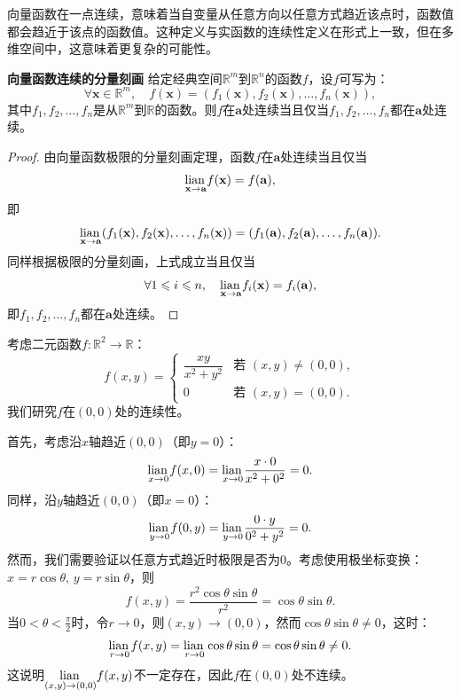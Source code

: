 \documentclass[12pt,UTF8]{ctexbook}
\begin{document}
向量函数在一点连续，意味着当自变量从任意方向以任意方式趋近该点时，函数值都会趋近于该点的函数值。这种定义与实函数的连续性定义在形式上一致，但在多维空间中，这意味着更复杂的可能性。


\begin{tm}{\textbf{向量函数连续的分量刻画}}
给定经典空间$\mathbb{R}^m$到$\mathbb{R}^n$的函数$f$，设$f$可写为：
$$ \forall \mathbf{x} \in \mathbb{R}^m, \quad f(\mathbf{x}) = (f_1(\mathbf{x}), f_2(\mathbf{x}), \ldots, f_n(\mathbf{x})), $$
其中$f_1, f_2, \ldots, f_n$是从$\mathbb{R}^m$到$\mathbb{R}$的函数。则$f$在$\mathbf{a}$处连续当且仅当$f_1, f_2, \ldots, f_n$都在$\mathbf{a}$处连续。
\end{tm}

\begin{proof}
由向量函数极限的分量刻画定理，函数$f$在$\mathbf{a}$处连续当且仅当
$$ \underset{\mathbf{x}\to \mathbf{a}}{\operatorname{lian}\,} f(\mathbf{x}) = f(\mathbf{a}), $$
即
$$ \underset{\mathbf{x}\to \mathbf{a}}{\operatorname{lian}\,} (f_1(\mathbf{x}), f_2(\mathbf{x}), \ldots, f_n(\mathbf{x})) = (f_1(\mathbf{a}), f_2(\mathbf{a}), \ldots, f_n(\mathbf{a})). $$
同样根据极限的分量刻画，上式成立当且仅当
$$ \forall 1 \leqslant i \leqslant n, \quad \underset{\mathbf{x}\to \mathbf{a}}{\operatorname{lian}\,} f_i(\mathbf{x}) = f_i(\mathbf{a}), $$
即$f_1, f_2, \ldots, f_n$都在$\mathbf{a}$处连续。
\end{proof}

\begin{ex}
考虑二元函数$f: \mathbb{R}^2 \to \mathbb{R}$：
$$ f(x, y) = \begin{cases}
\dfrac{xy}{x^2+y^2} & \text{若 } (x, y) \neq (0, 0), \\
0 & \text{若 } (x, y) = (0, 0).
\end{cases} $$
我们研究$f$在$(0, 0)$处的连续性。

首先，考虑沿$x$轴趋近$(0, 0)$（即$y=0$）：
$$ \underset{x\to 0}{\operatorname{lian}\,} f(x, 0) = \underset{x\to 0}{\operatorname{lian}\,} \frac{x \cdot 0}{x^2+0^2} = 0. $$
同样，沿$y$轴趋近$(0, 0)$（即$x=0$）：
$$ \underset{y\to 0}{\operatorname{lian}\,} f(0, y) = \underset{y\to 0}{\operatorname{lian}\,} \frac{0 \cdot y}{0^2+y^2} = 0. $$
然而，我们需要验证以任意方式趋近时极限是否为$0$。考虑使用极坐标变换：$x = r\cos\theta$, $y = r\sin\theta$，则
$$ f(x, y) = \frac{r^2\cos\theta\sin\theta}{r^2} = \cos\theta\sin\theta. $$
当$0<\theta <\displaystyle \frac{\pi}{2}$时，令$r \to 0$，则$(x,y) \to (0,0)$，然而$\cos\theta\sin\theta \neq 0$，这时：
$$ \underset{r\to 0}{\operatorname{lian}\,} f(x, y)  = \underset{r\to 0}{\operatorname{lian}\,} \cos\theta\sin\theta = \cos\theta\sin\theta \neq 0. $$
这说明$\underset{(x,y)\to(0,0)}{\operatorname{lian}\,} f(x, y)$不一定存在，因此$f$在$(0, 0)$处不连续。
\end{ex}
\end{document}
